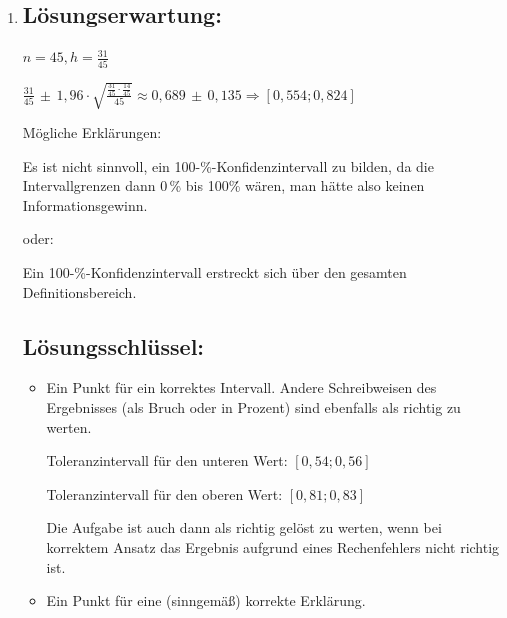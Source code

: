 \begin{langesbeispiel}
{\begin{enumerate}
\item \subsection{Lösungserwartung:}
			
$n=45, h=\frac{31}{45}$

$\frac{31}{45}\,\pm\,1,96\cdot\sqrt{\frac{\frac{31}{45}\cdot\frac{14}{45}}{45}}\approx 0,689\,\pm\,0,135 \Rightarrow [0,554;0,824]$\leer

Mögliche Erklärungen:

Es ist nicht sinnvoll, ein 100-\%-Konfidenzintervall zu bilden, da die Intervallgrenzen dann 0\,\% bis 100\.\% wären, man hätte also keinen Informationsgewinn. 

 oder:  

 Ein 100-\%-Konfidenzintervall erstreckt sich über den gesamten Definitionsbereich.
	\subsection{Lösungsschlüssel:}
	
\begin{itemize}
	\item Ein Punkt für ein korrektes Intervall. Andere Schreibweisen des Ergebnisses (als Bruch oder in Prozent) sind ebenfalls als richtig zu werten. 
	
	Toleranzintervall für den unteren Wert: $[0,54; 0,56]$ 
	
	Toleranzintervall für den oberen Wert: $[0,81; 0,83]$ 
	
	Die Aufgabe ist auch dann als richtig gelöst zu werten, wenn bei korrektem Ansatz das Ergebnis aufgrund eines Rechenfehlers nicht richtig ist. 
	\item Ein Punkt für eine (sinngemäß) korrekte Erklärung.
\end{itemize}
\end{enumerate}}
		\end{langesbeispiel}
